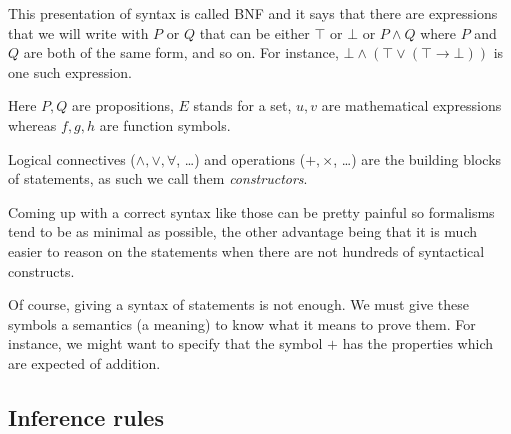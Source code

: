 This presentation of syntax is called \acrfull{BNF} and it says that there are
expressions that we will write with \(P\) or \(Q\) that can be either \(\top\)
or \(\bot\) or \(P \wedge Q\) where \(P\) and \(Q\) are both of the same form,
and so on.
For instance, \(\bot \wedge (\top \vee (\top \to \bot))\) is one such
expression.

Here \(P,Q\) are propositions, \(E\) stands for a set, \(u,v\) are mathematical
expressions whereas \(f,g,h\) are function symbols.

Logical connectives (\(\wedge, \vee, \forall\), \dots) and operations
(\(+, \times\), \dots) are the building blocks of statements, as such we call
them \emph{constructors}.

Coming up with a correct syntax like those can be pretty painful so formalisms
tend to be as minimal as possible, the other advantage being that it is much
easier to reason on the statements when there are not hundreds of syntactical
constructs.

Of course, giving a syntax of statements is not enough. We must give these
symbols a semantics (\ie a meaning) to know what it means to prove them.
For instance, we might want to specify that the symbol \(+\) has the properties
which are expected of addition.

\subsection{Inference rules}

